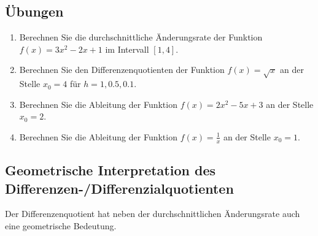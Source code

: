 \subsection{Übungen}
\begin{enumerate}
    \item Berechnen Sie die durchschnittliche Änderungsrate der Funktion $f(x) = 3x^2 - 2x + 1$ im Intervall $[1, 4]$.
    \item Berechnen Sie den Differenzenquotienten der Funktion $f(x) = \sqrt{x}$ an der Stelle $x_0 = 4$ für $h = 1, 0.5, 0.1$.
    \item Berechnen Sie die Ableitung der Funktion $f(x) = 2x^2 - 5x + 3$ an der Stelle $x_0 = 2$.
    \item Berechnen Sie die Ableitung der Funktion $f(x) = \frac{1}{x}$ an der Stelle $x_0 = 1$.
\end{enumerate}
\newpage
\subsection{Geometrische Interpretation des Differenzen-/Differenzialquotienten}
Der Differenzenquotient hat neben der durchschnittlichen Änderungsrate auch eine geometrische Bedeutung.

